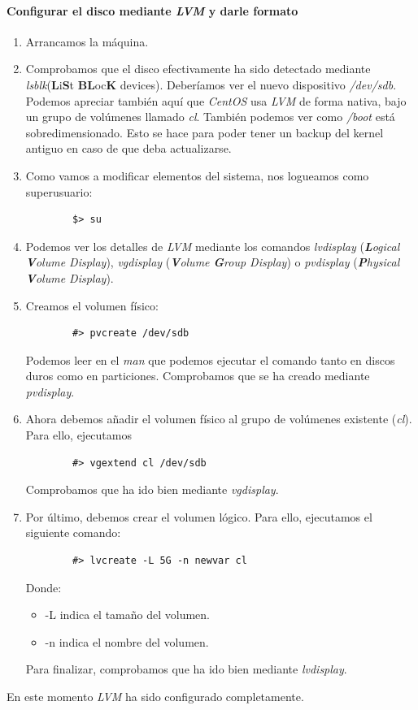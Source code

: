 \documentclass[12pt,spanish]{article}
\begin{document}
\paragraph{Configurar el disco mediante \textit{LVM} y darle formato}
\begin{enumerate}
	\item Arrancamos la máquina.
	\item Comprobamos que el disco efectivamente ha sido detectado mediante \textit{lsblk}(\textbf{L}i\textbf{S}t \textbf{BL}oc\textbf{K} devices). Deberíamos ver el nuevo dispositivo \textit{/dev/sdb}. Podemos apreciar también aquí que \emph{CentOS} usa \textit{LVM} de forma nativa, bajo un grupo de volúmenes llamado \textit{cl}. También podemos ver como \textit{/boot} está sobredimensionado. Esto se hace para poder tener un backup del kernel antiguo en caso de que deba actualizarse.
	\item Como vamos a modificar elementos del sistema, nos logueamos como superusuario:
	\begin{lstlisting}
		$> su
	\end{lstlisting}
	\item Podemos ver los detalles de \textit{LVM} mediante los comandos \textit{lvdisplay} (\textit{\textbf{L}ogical \textbf{V}olume Display}), \textit{vgdisplay} (\textit{\textbf{V}olume \textbf{G}roup Display}) o \textit{pvdisplay} (\textit{\textbf{P}hysical \textbf{V}olume Display}).
	\item Creamos el volumen físico:
	\begin{lstlisting}
		#> pvcreate /dev/sdb
	\end{lstlisting}
	Podemos leer en el \textit{man} que podemos ejecutar el comando tanto en discos duros como en particiones. Comprobamos que se ha creado mediante \textit{pvdisplay}.
	\item Ahora debemos añadir el volumen físico al grupo de volúmenes existente (\textit{cl}). Para ello, ejecutamos
	\begin{lstlisting}
		#> vgextend cl /dev/sdb
	\end{lstlisting}
	Comprobamos que ha ido bien mediante \textit{vgdisplay}.
	\item Por último, debemos crear el volumen lógico. Para ello, ejecutamos el siguiente comando:
	\begin{lstlisting}
		#> lvcreate -L 5G -n newvar cl
	\end{lstlisting}
	Donde:
	\begin{itemize}
		\item -L indica el tamaño del volumen.
		\item -n indica el nombre del volumen.
	\end{itemize}
	Para finalizar, comprobamos que ha ido bien mediante \textit{lvdisplay}.
\end{enumerate}
En este momento \textit{LVM} ha sido configurado completamente.
\end{document}
